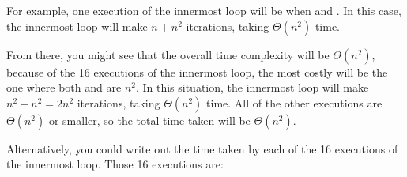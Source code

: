 \begin{prob}
\begin{subprobset}
\begin{subprob}
\begin{soln}
                For example, one execution of the innermost loop will be when  and .
                In this case, the innermost loop will make $n + n^2$ iterations, taking $\Theta(n^2)$ time.

                From there, you might see that the overall time complexity will
                be $\Theta(n^2)$, because of the 16 executions of the innermost
                loop, the most costly will be the one where both 
                and  are $n^2$. In this situation, the innermost
                loop will make $n^2 + n^2 = 2n^2$ iterations, taking
                $\Theta(n^2)$ time. All of the other executions are
                $\Theta(n^2)$ or smaller, so the total time taken will be
                $\Theta(n^2)$.

                Alternatively, you could write out the time taken by each of the 16 executions of the innermost loop.
                Those 16 executions are:



\end{soln}
\end{subprob}
\end{subprobset}
\end{prob}
